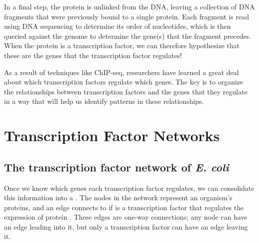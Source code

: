 In a final step, the protein is unlinked from the DNA, leaving a collection of DNA fragments that were previously bound to a single protein. Each fragment is read using DNA sequencing to determine its order of nucleotides, which is then queried against the genome to determine the gene(s) that the fragment precedes. When the protein is a transcription factor, we can therefore hypothesize that these are the genes that the transcription factor regulates!\\

\begin{qbox}\end{qbox}

As a result of techniques like ChIP-seq, researchers have learned a great deal about which transcription factors regulate which genes. The key is to organize the relationships between transcription factors and the genes that they regulate in a way that will help us identify patterns in these relationships.\\


\FloatBarrier
{}

\section{Transcription Factor Networks}
\label{sec:transcription_factor_networks}

\subsection{The transcription factor network of \textit{E. coli}}

Once we know which genes each transcription factor regulates, we can consolidate this information into a . The nodes in the network represent an organism's proteins, and an edge connects  to  if  is a transcription factor that regulates the expression of protein . These edges are one-way connections; any node can have an edge leading into it, but only a transcription factor can have an edge leaving it.


